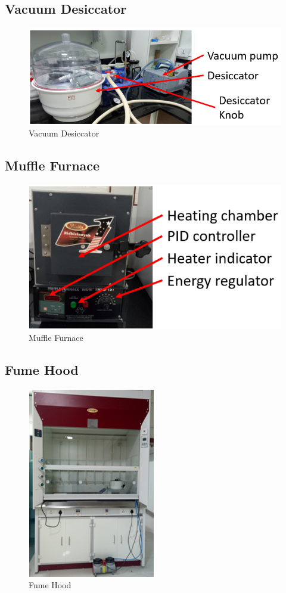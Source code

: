 \subsection{Vacuum Desiccator}
\begin{figure}[H]
	\centering
   \includegraphics[scale=0.56]{Images/11.png} 
   \caption{Vacuum Desiccator}
\end{figure}

\subsection{Muffle Furnace}
\begin{figure}[H]
	\centering
   \includegraphics[scale=0.56]{Images/12.png} 
   \caption{Muffle Furnace}
\end{figure}

\subsection{Fume Hood}
\begin{figure}[H]
	\centering
   \includegraphics[scale=0.56]{Images/13.png} 
   \caption{Fume Hood}
\end{figure}

